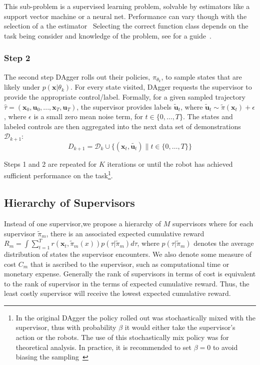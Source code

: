 \documentclass[10pt, conference]{ieeeconf}      %
\newcommand{\bu}{\mathbf{u}}
\newcommand{\bx}{\mathbf{x}}
\newcommand{\fpnote}[1]{\ifthenelse{ \boolean{include-notes}}%
 {\textcolor{blue}{\textbf{FP: #1}}}{}}
\begin{document}
This sub-problem is a supervised learning problem, solvable by estimators like a support vector machine or a neural net. Performance can vary though with the selection of a the estimator~ Selecting the correct function class depends on the task being consider and knowledge of the problem, see for a guide~\cite{scholkopf2002learning}. 
 

 \subsubsection{Step 2}
The second step  DAgger rolls out their policies, $\pi_{\theta_{k}}$, to sample states that are likely under $p(\bx|\theta_{k})$.  For every state visited, DAgger requests the supervisor to provide the appropriate control/label. Formally, for a given sampled trajectory  $\hat{\tau} = (\bx_0,\bu_0,...,\bx_T,\bu_T )$, the supervisor provides labels $\tilde{\bu}_t$, where $\tilde{\bu}_t \sim \tilde{\pi}(\bx_t) + \epsilon$, where $\epsilon$ is a small zero mean noise term, for $t\in \{0, \ldots, T\}$.
The states and labeled controls are then aggregated into the next data set of demonstrations $\mathcal{D}_{k+1}$:
$$D_{k+1}=\mathcal{D}_k \cup \{(\bx_t,\tilde{\bu_t})\|t\in\{0,\ldots,T\}\} $$

Steps 1 and 2 are repeated for $K$ iterations or until 
the robot has achieved sufficient performance on the task\footnote{In the original DAgger the policy rolled out
was stochastically mixed with the supervisor, thus with probability $\beta$ it would either take the supervisor's action
or the robots. The use of this stochastically mix policy was for theoretical analysis. In practice, it is recommended
to set $\beta = 0$ to avoid biasing the sampling~\cite{NIPS2014_5421,ross2010reduction}}.



\subsection{Hierarchy of Supervisors}\label{sec:hS}
Instead of one  supervisor,we propose a hierarchy  of $M$ supervisors where for each supervisor $\tilde{\pi}_m$, there is an associated expected cumulative reward $R_m = \int \sum^T_{t=1} r(\mathbf{x}_t, \tilde{\pi}_m(x)) p(\tau |\tilde{\pi}_m)d\tau$, where $p(\tau |\tilde{\pi}_m)$ denotes the average distribution of states the supervisor encounters. We also denote some measure of cost $C_m$ that is ascribed to the supervisor, such as computational time or monetary expense. Generally the rank of supervisors in terms of cost is equivalent to the rank of supervisor in the terms of expected cumulative reward. Thus, the least costly supervisor will receive the lowest expected cumulative reward. 
\end{document}
